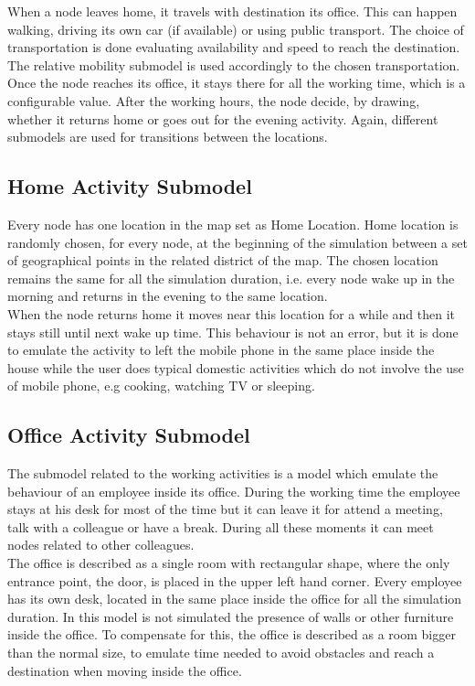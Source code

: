 When a node leaves home, it travels with destination its office. This can happen walking, driving its own car (if available) or using public transport. The choice of transportation is done evaluating availability and speed to reach the destination. The relative mobility submodel is used accordingly to the chosen transportation.
\\

Once the node reaches its office, it stays there for all the working time, which is a configurable value. After the working hours, the node decide, by drawing, whether it returns home or goes out for the evening activity. Again, different submodels are used for transitions between the locations.


\subsection{Home Activity Submodel}
Every node has one location in the map set as Home Location. Home location is randomly chosen, for every node, at the beginning of the simulation between a set of geographical points in the related district of the map. The chosen location remains the same for all the simulation duration, i.e. every node wake up in the morning and returns in the evening to the same location.
\\

When the node returns home it moves near this location for a while and then it stays still until next wake up time. This behaviour is not an error, but it is done to emulate the activity to left the mobile phone in the same place inside the house while the user does typical domestic activities which do not involve the use of mobile phone, e.g cooking, watching TV or sleeping.

\subsection{Office Activity Submodel}
The submodel related to the working activities is a model which emulate the behaviour of an employee inside its office. During the working time the employee stays at his desk for most of the time but it can leave it for attend a meeting, talk with a colleague or have a break. During all these moments it can meet nodes related to other colleagues.
\\

The office is described as a single room with rectangular shape, where the only entrance point, the door, is placed in the upper left hand corner. Every employee has its own desk, located in the same place inside the office for all the simulation duration. In this model is not simulated the presence of walls or other furniture inside the office. To compensate for this, the office is described as a room bigger than the normal size, to emulate time needed to avoid obstacles and reach a destination when moving inside the office.
\\

